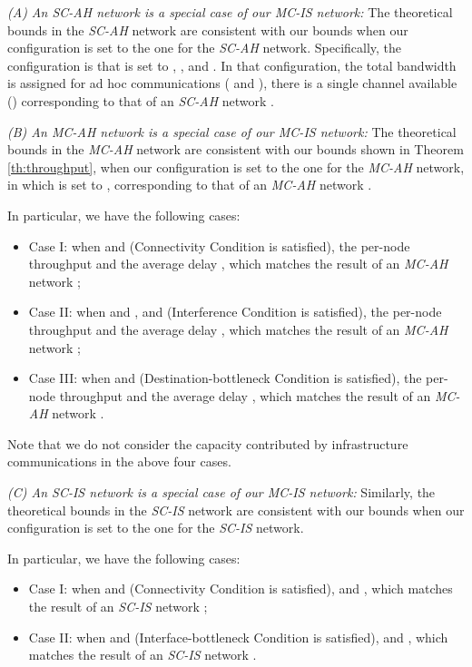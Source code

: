 \documentclass[10pt,journal]{IEEEtran}
\begin{document}
\textit{(A) An \textit{SC-AH} network is a special case of our \textit{MC-IS} network:}
The theoretical bounds in the \textit{SC-AH} network \cite{Gupta:Kumar} are consistent with our bounds when our configuration is set to the one for the \textit{SC-AH} network. Specifically, the configuration is that  is set to , ,  and . In that configuration, the total bandwidth is assigned for ad hoc communications ( and ), there is a single channel available () corresponding to that of an \textit{SC-AH} network \cite{Gupta:Kumar}. 

\textit{(B) An \textit{MC-AH} network is a special case of our \textit{MC-IS} network:}
The theoretical bounds in the \textit{MC-AH} network \cite{Kyasanur:mobicom2005} are consistent with our bounds shown in Theorem \ref{th:throughput}, when our configuration is set to the one for the \textit{MC-AH} network, in which  is set to , corresponding to that of an \textit{MC-AH} network \cite{Kyasanur:mobicom2005}. 

In particular, we have the following cases:
\begin{itemize}
\item Case I: when  and  (Connectivity Condition is  satisfied), the per-node throughput  and the average delay , which matches the result of an \textit{MC-AH} network \cite{Kyasanur:mobicom2005};

\item Case II: when  and , and   (Interference Condition is satisfied), the per-node throughput  and the average delay , which matches the result of an \textit{MC-AH} network \cite{Kyasanur:mobicom2005};

\item Case III: when  and   (Destination-bottleneck Condition is satisfied), the per-node throughput  and the average delay , which matches the result of an \textit{MC-AH} network \cite{Kyasanur:mobicom2005}.
\end{itemize}
Note that we do not consider the capacity contributed by infrastructure communications in the above four cases.

\textit{(C) An \textit{SC-IS} network is a special case of our \textit{MC-IS} network:}
Similarly, the theoretical bounds in the \textit{SC-IS} network \cite{panli:jsac09} are consistent with our bounds when our configuration is set to the one for the \textit{SC-IS} network. 

In particular, we have the following cases:
\begin{itemize}
\item Case I: when  and  (Connectivity Condition is satisfied),  and , which matches the result of an \textit{SC-IS} network \cite{panli:jsac09};
\item Case II: when  and  (Interface-bottleneck Condition is satisfied),  and , which matches the result of an \textit{SC-IS} network \cite{panli:jsac09}.
\end{itemize}
\end{document}
